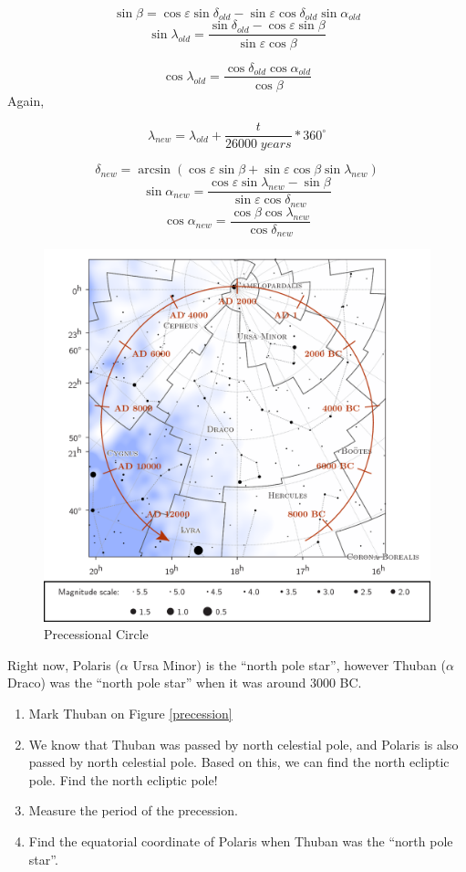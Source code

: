 \documentclass[a4paper,12pt]{extarticle}
\begin{document}
$$\sin\beta=\cos\varepsilon \sin\delta_{old}-\sin\varepsilon\cos\delta_{old}\sin\alpha_{old}$$
$$\sin\lambda_{old}=\frac{\sin\delta_{old}-\cos\varepsilon \sin\beta}{\sin\varepsilon \cos\beta}$$

$$\cos\lambda_{old}=\frac{\cos\delta_{old}\cos\alpha_{old}}{\cos\beta}$$
Again, 

$$\lambda_{new}=\lambda_{old}+\frac{t}{26000\; years}\ast 360^\circ$$

$$\delta_{new}=\arcsin(\cos\varepsilon\sin\beta+\sin\varepsilon\cos\beta \sin\lambda_{new})$$
$$\sin\alpha_{new}=\frac{\cos\varepsilon\sin\lambda_{new}-\sin\beta}{\sin\varepsilon\cos\delta_{new}}$$
$$\cos\alpha_{new}=\frac{\cos\beta\cos\lambda_{new}}{\cos\delta_{new}}$$

\begin{figure}[H]
	\centering
	\includegraphics[width=0.7 \linewidth]{presc1.png}
	\caption{Precessional Circle}
	\label{pcircle}
\end{figure}
Right now, Polaris ($\alpha$ Ursa Minor) is the ``north pole star'', however Thuban ($\alpha$ Draco) was the ``north pole star'' when it was around 3000 BC.

\begin{enumerate}[Q1.]
	\item Mark Thuban on Figure \ref{precession}
	\item We know that Thuban was passed by north celestial pole, and Polaris is also passed by north celestial pole. Based on this, we can find the north ecliptic pole. Find the north ecliptic pole!
	\item Measure the period of the precession.
	\item Find the equatorial coordinate of Polaris when Thuban was the ``north pole star''.
\end{enumerate}
\end{document}
